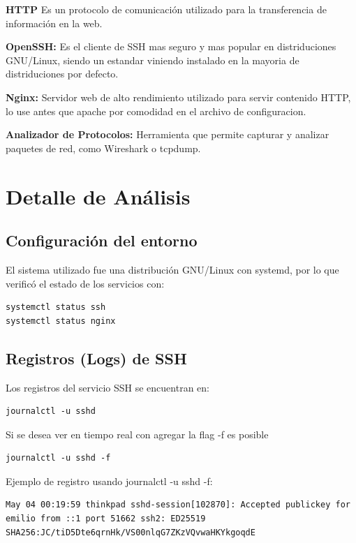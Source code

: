 \documentclass[12pt]{article}
\begin{document}
\textbf{HTTP}  
Es un protocolo de comunicación utilizado para la transferencia de información en la web.


\textbf{OpenSSH:}  
Es el cliente de SSH mas seguro y mas popular en distriduciones GNU/Linux, siendo un estandar viniendo instalado en la mayoria de distriduciones por defecto.

\textbf{Nginx:}  
Servidor web de alto rendimiento utilizado para servir contenido HTTP, lo use antes que apache por comodidad en el archivo de configuracion.

\textbf{Analizador de Protocolos:}  
Herramienta que permite capturar y analizar paquetes de red, como Wireshark o tcpdump.

\newpage

\section{Detalle de Análisis}

\subsection{Configuración del entorno}

El sistema utilizado fue una distribución GNU/Linux con systemd, por lo que verificó el estado de los servicios con:

\begin{verbatim}
systemctl status ssh
systemctl status nginx
\end{verbatim}

\subsection{Registros (Logs) de SSH}

Los registros del servicio SSH se encuentran en:

\begin{verbatim}
journalctl -u sshd 
\end{verbatim}

Si se desea ver en tiempo real con agregar la flag -f es posible

\begin{verbatim}
journalctl -u sshd -f
\end{verbatim}

Ejemplo de registro usando journalctl -u sshd -f:

\begin{verbatim}
May 04 00:19:59 thinkpad sshd-session[102870]: Accepted publickey for emilio from ::1 port 51662 ssh2: ED25519 SHA256:JC/tiD5Dte6qrnHk/VS00nlqG7ZKzVQvwaHKYkgoqdE
\end{verbatim}
\end{document}

